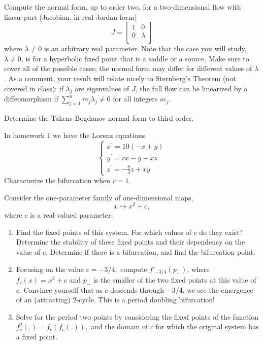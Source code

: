 \documentclass{article}
\begin{document}
\begin{list}
\item Compute the normal form, up to order two, for a two-dimensional flow with linear part (Jacobian, in real Jordan form) $$
   J=
  \left[ {\begin{array}{cc}
   1 & 0 \\
   0 & \lambda \\
  \end{array} } \right] $$ where $\lambda \neq 0$ is an arbitrary real parameter.    Note that the case you will study, $\lambda \neq 0$, is for a hyperbolic fixed point that is a saddle or a source.  Make sure to cover all of the possible cases; the normal form may differ for different values of $\lambda$.  As a comment, your result will relate nicely to Sternberg's Theorem (not covered in class):  if $\lambda_j$ are eigenvalues of $J$, the full flow can be linearized by a diffeomorphism if $\sum_{j=1}^n m_j \lambda_j \neq 0$ for all integers $m_j$.


\item Determine the Takens-Bogdanov normal form to third order.

\item In homework 1 we have the Lorenz equations
\begin{equation}
\left\{\begin{array}{l}
x^{\prime}=10(-x+y) \\
y^{\prime}=r x-y-x z \\
z^{\prime}=-\frac{8}{3} z+x y
\end{array}\right.
\end{equation}
Characterize the bifurcation when $r=1$.

\item Consider the one-parameter family of one-dimensional maps,
\begin{equation}
    x \mapsto x^2 + c,
\end{equation}
where $c$ is a real-valued parameter.
    \begin{enumerate}
        \item Find the fixed points of this system. For which values of $c$ do they exist? Determine the stability of these fixed points and their dependency on the value of $c$. Determine if there is a bifurcation, and find the bifurcation point.
        \item Focusing on the value $c = -3/4,$ compute $f'_{-3/4}(p_{-})$, where $f_c(x) = x^2 + c$ and $p_{-}$ is the smaller of the two fixed points at this value of $c.$ Convince yourself that as $c$ descends through $-3/4$, we see the emergence of an (attracting) 2-cycle. This is a period doubling bifurcation!
        \item Solve for the period two points by considering the fixed points of the function $f_c^2(.) = f_c(f_c(.)),$ and the domain of $c$ for which the original system has a fixed point. 
    \end{enumerate}

 \end{list} 
\end{document}
